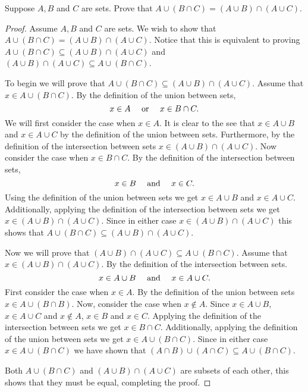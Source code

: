 \documentclass{report}
\begin{document}
\begin{proposition}{}{}
  Suppose $A, B$ and $C$ are sets.
  Prove that $A \cup \left(B \cap C \right) = \left(A \cup B \right) \cap \left(A \cup C\right)$.
\end{proposition}

\begin{proof}
  Assume $A, B$ and $C$ are sets.
  We wish to show that $A \cup \left(B \cap C \right) = \left(A \cup B \right) \cap \left(A \cup C\right)$.
  Notice that this is equivalent to proving $A \cup \left(B \cap C \right) \subseteq \left(A \cup B \right) \cap \left(A \cup C\right)$ and $\left(A \cup B \right) \cap \left(A \cup C\right) \subseteq A \cup \left(B \cap C\right)$.

  To begin we will prove that $A \cup \left(B \cap C\right) \subseteq \left(A \cup B\right) \cap \left(A \cup C\right)$.
  Assume that $x \in A \cup \left(B \cap C\right)$.
  By the definition of the union between sets, $$x \in A \quad \text{ or } \quad x \in B \cap C.$$
  We will first consider the case when $x \in A$.
  It is clear to the see that $x \in A \cup B$ and $x \in A \cup C$ by the definition of the union between sets.
  Furthermore, by the definition of the intersection between sets $x \in \left(A \cup B\right) \cap \left(A \cup C\right)$.
  Now consider the case when $x \in B \cap C$. By the definition of the intersection between sets, $$x \in B \quad \text{ and } \quad x \in C.$$
  Using the definition of the union between sets we get $x \in A \cup B$ and $x \in A \cup C$.
  Additionally, applying the definition of the intersection between sets we get $x \in \left(A \cup B\right) \cap \left(A \cup C\right)$.
  Since in either case $x \in \left(A \cup B\right) \cap \left(A \cup C\right)$ this shows that $A \cup \left(B \cap C\right) \subseteq \left(A \cup B\right) \cap \left(A \cup C\right)$.

  Now we will prove that $\left(A \cup B\right) \cap \left(A \cup C\right) \subseteq A \cup \left(B \cap C\right)$.
  Assume that $x \in \left(A \cup B\right) \cap \left(A \cup C\right)$.
  By the definition of the intersection between sets. $$x \in A \cup B \quad \text{ and } \quad x \in A \cup C.$$
  First consider the case when $x \in A$.
  By the definition of the union between sets $x \in A \cup \left(B \cap B\right)$.
  Now, consider the case when $x \notin A$. Since $x \in A \cup B$, $x \in A \cup C$ and $x \notin A$,  $x \in B$ and $x \in C$.
  Applying the definition of the intersection between sets we get $x \in B \cap C$.
  Additionally, applying the definition of the union between sets we get $x \in A \cup \left(B \cap C\right)$.
  Since in either case $x \in A \cup \left(B \cap C\right)$ we have shown that $\left(A \cap B\right) \cup \left(A \cap C\right) \subseteq A \cup \left(B \cap C\right)$.

  Both $A \cup \left(B \cap C\right)$ and $\left(A \cup B\right) \cap \left(A \cup C\right)$ are subsets of each other, this shows that they must be equal, completing the proof.
\end{proof}
\end{document}

